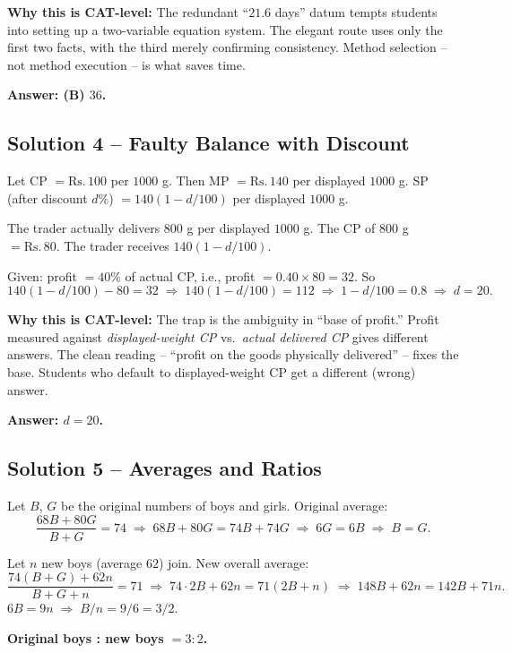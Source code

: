 \documentclass[11pt,a4paper]{article}
\begin{document}
\textbf{Why this is CAT-level:} The redundant ``$21.6$ days'' datum tempts students into setting up a two-variable equation system. The elegant route uses only the first two facts, with the third merely confirming consistency. Method selection -- not method execution -- is what saves time.

\textbf{Answer: (B) $36$.}

\medskip

\subsection*{Solution 4 -- Faulty Balance with Discount}
Let CP $= \text{Rs.}\,100$ per $1000$ g. Then MP $= \text{Rs.}\,140$ per displayed $1000$ g. SP (after discount $d\%$) $= 140(1-d/100)$ per displayed $1000$ g.

The trader actually delivers $800$ g per displayed $1000$ g. The CP of $800$ g $=\text{Rs.}\,80$. The trader receives $140(1-d/100)$.

Given: profit $= 40\%$ of actual CP, i.e., profit $= 0.40\times 80 = 32$. So
\[
140(1-d/100) - 80 = 32 \;\Longrightarrow\; 140(1-d/100) = 112 \;\Longrightarrow\; 1-d/100 = 0.8 \;\Longrightarrow\; d = 20.
\]

\textbf{Why this is CAT-level:} The trap is the ambiguity in ``base of profit.'' Profit measured against \emph{displayed-weight CP} vs.\ \emph{actual delivered CP} gives different answers. The clean reading -- ``profit on the goods physically delivered'' -- fixes the base. Students who default to displayed-weight CP get a different (wrong) answer.

\textbf{Answer: $d = 20$.}

\medskip

\subsection*{Solution 5 -- Averages and Ratios}
Let $B$, $G$ be the original numbers of boys and girls. Original average:
\[
\frac{68B + 80G}{B+G} = 74 \;\Longrightarrow\; 68B + 80G = 74B + 74G \;\Longrightarrow\; 6G = 6B \;\Longrightarrow\; B=G.
\]

Let $n$ new boys (average $62$) join. New overall average:
\[
\frac{74(B+G) + 62n}{B+G+n} = 71 \;\Longrightarrow\; 74\cdot 2B + 62n = 71(2B+n) \;\Longrightarrow\; 148B + 62n = 142B + 71n.
\]
$6B = 9n \;\Longrightarrow\; B/n = 9/6 = 3/2.$

\textbf{Original boys : new boys $= 3:2$.}
\end{document}
